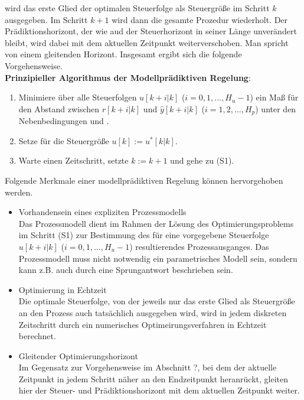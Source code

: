 wird das erste Glied der optimalen Steuerfolge als Steuergröße im Schritt $k$ ausgegeben. Im Schritt $k+1$ wird dann die gesamte Prozedur wiederholt. Der Prädiktionshorizont, der wie
aud der Steuerhorizont in seiner Länge unverändert bleibt, wird dabei mit dem aktuellen Zeitpunkt weiterverschoben. Man spricht von einem gleitenden Horizont. Insgesamt ergibt sich die
folgende Vorgehensweise.\\
\textbf{Prinzipieller Algorithmus der Modellprädiktiven Regelung}:
\begin{enumerate}[label=(S\arabic*)]
  \item Minimiere über alle Steuerfolgen $u[k+i|k]$ ($i=0,1,\ldots,H_u-1$) ein Maß für den Abstand zwischen $r[k+i|k]$ und $\hat{y}[k+i|k]$ ($i=1,2,\ldots,H_p$) unter den
  Nebenbedingungen  und .
  \item Setze für die Steuergröße $u[k]:=u^{\ast}[k|k]$.
  \item Warte einen Zeitschritt, setzte $k:=k+1$ und gehe zu (S1).
\end{enumerate}
Folgende Merkmale einer modellprädiktiven Regelung können hervorgehoben werden.
\begin{itemize}
  \item Vorhandensein eines expliziten Prozessmodells\\
  		Das Prozessmodell dient im Rahmen der Lösung des Optimierungsproblems im Schritt (S1) zur Bestimmung des für eine vorgegebene Steuerfolge $u[k+i|k]$ ($i=0,1,\ldots,H_u-1$)
  		resultierendes Prozessausganges. Das Prozessmodell muss nicht notwendig ein parametrisches Modell sein, sondern kann z.B. auch durch eine Sprungantwort beschrieben sein.
  \item Optimierung in Echtzeit\\
  		Die optimale Steuerfolge, von der jeweils nur das erste Glied als Steuergröße an den Prozess auch tatsächlich ausgegeben wird, wird in jedem diskreten Zeitschritt durch ein
  		numerisches Optimeirungsverfahren in Echtzeit berechnet.
  \item Gleitender Optimierungshorizont\\
  		Im Gegensatz zur Vorgehensweise im Abschnitt ?, bei dem der aktuelle Zeitpunkt in jedem Schritt näher an den Endzeitpunkt heranrückt, gleiten hier der Steuer- und
  		Prädiktionshorizont mit dem aktuellen Zeitpunkt weiter. 
\end{itemize}

